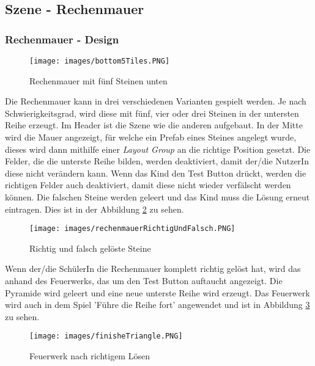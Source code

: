 \subsection{Szene - Rechenmauer}
\subsubsection{Rechenmauer - Design}
\begin{figure}[htbp]
  \centering
  \texttt{[image: images/bottom5Tiles.PNG]}
  \caption{Rechenmauer mit fünf Steinen unten}
  \label{triangle}
\end{figure}
Die Rechenmauer kann in drei verschiedenen Varianten gespielt werden. Je nach Schwierigkeitsgrad, wird diese mit fünf, vier oder drei Steinen in der untersten Reihe erzeugt. Im Header ist die Szene wie die anderen aufgebaut. In der Mitte wird die Mauer angezeigt, für welche ein Prefab eines Steines angelegt wurde, dieses wird dann mithilfe einer \textit{Layout Group} an die richtige Position gesetzt. Die Felder, die die unterste Reihe bilden, werden deaktiviert, damit der/die NutzerIn diese nicht verändern kann. Wenn das Kind den Test Button drückt, werden die richtigen Felder auch deaktiviert, damit diese nicht wieder verfälscht werden können. Die falschen Steine werden geleert und das Kind muss die Lösung erneut eintragen. Dies ist in der Abbildung \ref{wrongAndRightStone} zu sehen.\\
\begin{figure}[htbp]
  \centering
  \texttt{[image: images/rechenmauerRichtigUndFalsch.PNG]}
  \caption{Richtig und falsch gelöste Steine}
  \label{wrongAndRightStone}
\end{figure}Wenn der/die SchülerIn die Rechenmauer komplett richtig gelöst hat, wird das anhand des Feuerwerks, das um den Test Button auftaucht angezeigt. Die Pyramide wird geleert und eine neue unterste Reihe wird erzeugt. Das Feuerwerk wird auch in dem Spiel 'Führe die Reihe fort' angewendet und ist in Abbildung \ref{firework} zu sehen.
\begin{figure}[htbp]
  \centering
  \texttt{[image: images/finisheTriangle.PNG]}
  \caption{Feuerwerk nach richtigem Lösen}
  \label{firework}
\end{figure}
